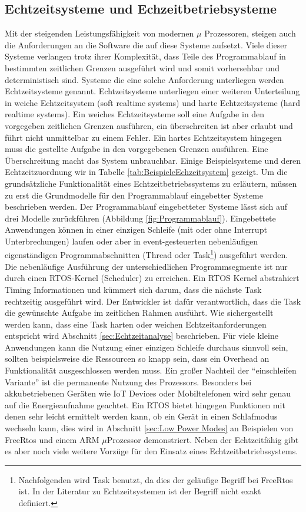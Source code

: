 \documentclass[ngerman]{seminarvorlage}
\begin{document}
\subsection{Echtzeitsysteme und Echzeitbetriebsysteme}
Mit der steigenden Leistungsfähigkeit von modernen $\mu$ Prozessoren, steigen auch die Anforderungen an die Software die auf diese Systeme aufsetzt. Viele dieser Systeme verlangen trotz ihrer Komplexität, dass Teile des Programmablauf in bestimmten zeitlichen Grenzen ausgeführt wird und somit vorhersehbar und deterministisch sind. Systeme die eine solche Anforderung unterliegen werden Echtzeitsysteme genannt. Echtzeitsysteme unterliegen einer weiteren Unterteilung in weiche Echtzeitsystem (soft realtime systems) und harte Echtzeitsysteme (hard realtime systems). Ein weiches Echtzeitsysteme soll eine Aufgabe in den vorgegeben zeitlichen Grenzen ausführen, ein über\-schreiten ist aber erlaubt und führt nicht unmittelbar zu einem Fehler. Ein hartes Echtzeitsystem hingegen muss die gestellte Aufgabe in den vorgegebenen Grenzen ausführen. Eine Überschreitung macht das System unbrauchbar. Einige Beispielsysteme und deren Echtzeitzuordnung wir in Tabelle \ref{tab:BeispieleEchzeitsystem} gezeigt. Um die grundsätzliche Funktionalität eines Echtzeitbetriebssystems zu erläutern, müssen zu erst die Grundmodelle für den Programmablauf eingebetter Systeme beschrieben werden. Der Programmablauf eingebetteter Systeme lässt sich auf drei Modelle zurückführen (Abbildung \ref{fig:Programmablauf}). Eingebettete Anwendungen können in einer einzigen Schleife (mit oder ohne Interrupt Unterbrechungen) laufen oder aber in event-gesteuerten nebenläufigen eigenständigen Programmabschnitten (Thread oder Task\footnote{Nachfolgenden wird Task benutzt, da dies der geläufige Begriff bei FreeRtos ist. In der Literatur zu Echtzeitsystemen ist der Begriff nicht exakt definiert.}) ausgeführt werden. Die nebenläufige Ausführung der unterschiedlichen Programmsegmente ist nur durch einen RTOS-Kernel (Scheduler) zu erreichen. Ein RTOS Kernel abstrahiert Timing Informationen und kümmert sich darum, dass die nächste Task rechtzeitig ausgeführt wird. Der Entwickler ist dafür verantwortlich, dass die Task die gewünschte Aufgabe im zeitlichen Rahmen ausführt. Wie sichergestellt werden kann, dass eine Task  harten oder weichen Echtzeitanforderungen entspricht wird Abschnitt \ref{sec:Echtzeitanalyse} beschrieben. Für viele kleine Anwendungen kann die Nutzung einer einzigen Schleife durchaus sinnvoll sein, sollten beispielsweise die Ressourcen so knapp sein, dass ein Overhead an Funktionalität ausgeschlossen werden muss. Ein großer Nachteil der "`einschleifen Variante"' ist die permanente Nutzung des Prozessors. Besonders bei akkubetriebenen Geräten wie IoT Devices oder Mobiltelefonen wird sehr genau auf die Energieaufnahme geachtet. Ein RTOS bietet hingegen Funktionen mit denen sehr leicht ermittelt werden kann, ob ein Gerät in einen Schlafmodus wechseln kann, dies wird in Abschnitt \ref{sec:Low Power Modes} an Beispielen von FreeRtos und einem ARM $\mu$Prozessor demonstriert. Neben der Echtzeitfähig gibt es aber noch viele weitere Vorzüge für den Einsatz eines Echtzeitbetriebssystems.  
\end{document}
